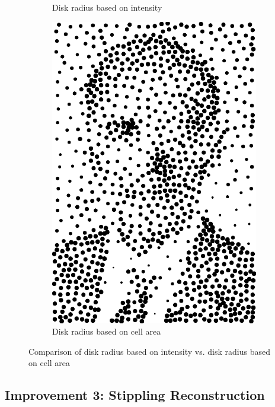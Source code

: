 \documentclass[11pt]{article}
\begin{document}
\begin{figure}[H]
\begin{subfigure}{0.4\textwidth}
 \caption{Disk radius based on intensity}
    \end{subfigure}
    \begin{subfigure}{0.4\textwidth}
        \centering
        \includegraphics[width=\textwidth]{../results/hedcuter/B-2.pdf}
 \caption{Disk radius based on cell area}
    \end{subfigure}
    \caption{Comparison of disk radius based on intensity vs. disk radius based on cell area}
    \label{fig:radius}
\end{figure}



\subsection*{Improvement 3: Stippling Reconstruction}
\end{document}
